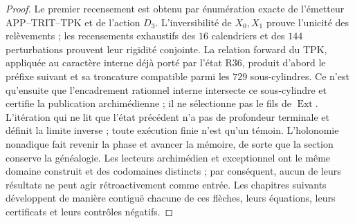 \begin{proof}
Le premier recensement est obtenu par énumération exacte de l'émetteur APP--TRIT--TPK et de
l'action \(D_3\). L'inversibilité de \(X_0,X_1\) prouve l'unicité des
relèvements ; les recensements exhaustifs des \(16\) calendriers et des \(144\)
perturbations prouvent leur rigidité conjointe. La relation forward du TPK,
appliquée au caractère interne déjà porté par l'état R36, produit d'abord le
préfixe suivant et sa troncature compatible parmi les \(729\)
sous-cylindres. Ce n'est qu'ensuite que l'encadrement rationnel interne intersecte ce
sous-cylindre et certifie la publication archimédienne ; il ne sélectionne pas le fils de
\(\operatorname{Ext}\). L'itération qui ne lit que l'état précédent n'a pas
de profondeur terminale et définit la limite inverse ; toute exécution finie n'est
qu'un témoin. L'holonomie nonadique fait revenir la phase et avancer la mémoire, de
sorte que la section conserve la généalogie. Les lecteurs archimédien et
exceptionnel ont le même domaine construit et des codomaines distincts ; par
conséquent, aucun de leurs résultats ne peut agir rétroactivement comme
entrée. Les chapitres suivants développent de manière contiguë chacune de
ces flèches, leurs équations, leurs certificats et leurs contrôles négatifs.
\end{proof}

